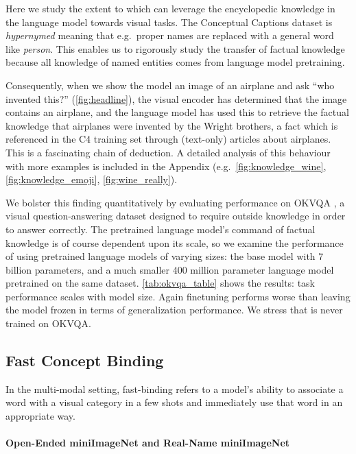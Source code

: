 Here we study the extent to which \Model can leverage the encyclopedic knowledge in the language model towards visual tasks. The Conceptual Captions dataset is \emph{hypernymed} meaning that e.g.\ proper names are replaced with a general word like {\it person}. This enables us to rigorously study the transfer of factual knowledge because all knowledge of named entities comes from language model pretraining.

Consequently, when we show the model an image of an airplane and ask ``who invented this?'' (\autoref{fig:headline}), the visual encoder has determined that the image contains an airplane, and the language model has used this to retrieve the factual knowledge that airplanes were invented by the Wright brothers, a fact which is referenced in the C4 training set through (text-only) articles about airplanes. This is a fascinating chain of deduction. A detailed analysis of this behaviour with more examples is included in the Appendix (e.g.\ \autoref{fig:knowledge_wine}, \autoref{fig:knowledge_emoji}, \autoref{fig:wine_really}).

We bolster this finding quantitatively by evaluating performance on OKVQA \cite{marino2019ok}, a visual question-answering dataset designed to require outside knowledge in order to answer correctly. The pretrained language model's command of factual knowledge is of course dependent upon its scale, so we examine the performance of \Model using pretrained language models of varying sizes: the base model with 7 billion parameters, and a much smaller 400 million parameter language model pretrained on the same dataset. \autoref{tab:okvqa_table} shows the results: task performance scales with model size. Again finetuning performs worse than leaving the model frozen in terms of generalization performance. We stress that \Model is never trained on OKVQA.

\subsection{Fast Concept Binding}
In the multi-modal setting, fast-binding refers to a model's ability to associate a word with a visual category in a few shots and immediately use that word in an appropriate way.

\paragraph{Open-Ended miniImageNet and Real-Name miniImageNet}

